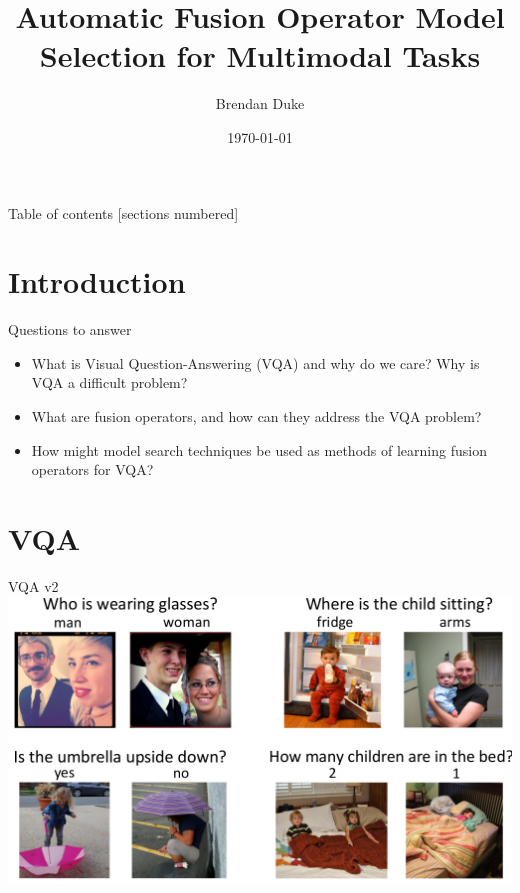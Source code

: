 \documentclass{beamer}
\title{Automatic Fusion Operator Model Selection for Multimodal Tasks}
\date{\today}
\author{Brendan Duke}
\institute{University of Guelph}
\begin{document}
\maketitle

\begin{frame}{Table of contents}
  [sections numbered]
  \tableofcontents[hideallsubsections]
\end{frame}


\section{Introduction}

\begin{frame}[fragile]{Questions to answer}
        \begin{itemize}[<+- | alert@+>]
                \item What is Visual Question-Answering (VQA) and why do we care?
                        Why is VQA a difficult problem?

                \item What are fusion operators, and how can they address the
                        VQA problem?

                \item How might model search techniques be used as methods of
                        learning fusion operators for VQA\@?
        \end{itemize}
\end{frame}


\section{VQA}

{%
\begin{frame}{VQA v2}
        \center{}
        \hspace*{-2mm}
        \includegraphics[scale=0.31]{data/vqa2-balanced-imgs}
\end{frame}
}
\end{document}
